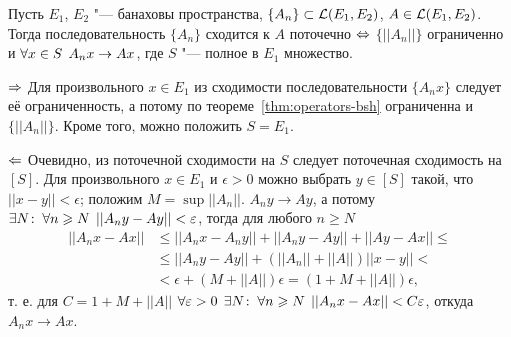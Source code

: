 \documentclass[main]{subfiles}
\begin{document}
\begin{theorem} %
  Пусть \( E_1 \), \( E_2 \) "--- банаховы пространства,
  \( \{ A_n \} \subset \Linears{E_1}[E_2] \),
  \( A \in \Linears{E_1}[E_2] \).
  Тогда последовательность \( \{ A_n \} \) сходится
  к \( A \) поточечно \( \Leftrightarrow \)
  \( \{ ||A_n|| \} \) ограниченно и \( \forall {x \in S} \; \,
  A_n x \to A x \),
  где \( S \) "--- полное в \( E_1 \) множество.
\end{theorem}
\begin{itemproof}
  \item[\( \Rightarrow \)]
    Для произвольного \( x \in E_1 \)
    из сходимости последовательности
    \( \{ A_n x \} \) следует её ограниченность,
    а потому по теореме~\ref{thm:operators-bsh}
    ограниченна и \( \{ ||A_n|| \} \).
    Кроме того, можно положить \( S = E_1 \).
  \item[\( \Leftarrow \)]
    Очевидно, из поточечной сходимости
    на \( S \) следует поточечная сходимость
    на \( [S] \).
    Для произвольного \( x \in E_1 \) и \( \epsilon > 0 \)
    можно выбрать \( y \in [S] \) такой,
    что \( ||x - y|| < \epsilon \);
    положим \( M = \sup ||A_n|| \).
    \( A_n y \to A y \), а потому
    \( \exists N \colon \: \forall {n \geqslant N} \; \, ||A_n y - A y|| < \varepsilon \),
    тогда для любого \( n \ge N \)
    \begin{align}
      ||A_n x - A x|| &\le
      ||A_n x - A_n y|| + ||A_n y - A y|| + ||A y - A x|| \le \\
      &\le ||A_n y - A y|| + (||A_n|| + ||A||) ||x - y|| < \\
      &< \epsilon + (M  + ||A||) \epsilon =
      (1 + M + ||A||) \epsilon,
    \end{align}
    т. е. для \( C = 1 + M + ||A|| \)
    \( \forall {\varepsilon> 0} \; \, \exists N \colon \:
    \forall {n \geqslant N} \; \, ||A_n x - A x|| < C \varepsilon \),
    откуда \( A_n x \to A x \).
\end{itemproof}
\end{document}

